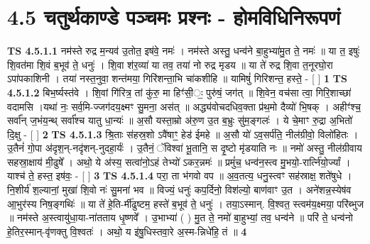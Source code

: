 \documentclass[17pt]{extarticle}
\begin{document}
     \section*{ 4.5      चतुर्थकाण्डे पञ्चमः प्रश्नः - होमविधिनिरूपणं }
                                        \textbf{ TS 4.5.1.1} \newline
                  नम॑स्ते रुद्र म॒न्यव॑ उ॒तोत॒ इष॑वे॒ नमः॑ । नम॑स्ते अस्तु॒ धन्व॑ने बा॒हुभ्या॑मु॒त ते॒ नमः॑ ॥                                   या त॒ इषुः॑ शि॒वत॑मा शि॒वं ब॒भूव॑ ते॒ धनुः॑ । शि॒वा श॑र॒व्या॑ या तव॒ तया॑ नो रुद्र मृडय ॥     या ते॑ रुद्र शि॒वा त॒नूरघो॒रा ऽपा॑पकाशिनी । तया॑ नस्त॒नुवा॒ शन्त॑मया॒ गिरि॑शन्ता॒भि चा॑कशीहि ॥                                यामिषुं॑ गिरिशन्त॒ हस्ते॒ - [  ] \textbf{  1} \newline
                  \newline
                                \textbf{ TS 4.5.1.2} \newline
                  बिभ॒र्ष्यस्त॑वे । शि॒वां गि॑रित्र॒ तां कु॑रु॒ मा हिꣳ॑सी॒ः॒ पुरु॑षं॒ जग॑त् ॥        शि॒वेन॒ वच॑सा त्वा॒ गिरि॒शाच्छा॑ वदामसि ।यथा॑ नः॒ सर्व॒मि-ज्जग॑दय॒क्ष्मꣳ सु॒मना॒ अस॑त् ॥                             अद्ध्य॑वोचदधिव॒क्ता प्र॑थ॒मो दैव्यो॑ भि॒षक् । अहीꣳ॑श्च॒॒ सर्वा᳚न् ज॒भंय॒न्थ् सर्वा᳚श्च यातु धा॒न्यः॑ ॥                          अ॒सौ यस्ता॒म्रो अ॑रु॒ण उ॒त ब॒भ्रुः सु॑म॒ङ्गलः॑ । ये चे॒माꣳ रु॒द्रा अ॒भितो॑ दि॒क्षु - [  ] \textbf{  2} \newline
                  \newline
                                \textbf{ TS 4.5.1.3} \newline
                  श्रि॒ताः स॑हस्र॒शो ऽवै॑षाꣳ॒॒ हेड॑ ईमहे ॥ अ॒सौ यो॑ ऽव॒सर्प॑ति॒ नील॑ग्रीवो॒ विलो॑हितः । उ॒तैनं॑ गो॒पा अ॑दृश॒न्-नदृ॑शन्-नुदहा॒र्यः॑ । उ॒तैनं॒ ॅविश्वा॑ भू॒तानि॒ स दृ॒ष्टो मृ॑डयाति नः ॥                               नमो॑ अस्तु॒ नील॑ग्रीवाय सहस्रा॒क्षाय॑ मी॒ढुषे᳚ । अथो॒ ये अ॑स्य॒ सत्वा॑नो॒ऽहं तेभ्यो॑ ऽकर॒न्नमः॑ ॥                                   प्रमुं॑च॒ धन्व॑न॒स्त्व मु॒भयो॒-रार्त्नि॑यो॒र्ज्यां । याश्च॑ ते॒ हस्त॒ इष॑वः॒ - [  ] \textbf{  3} \newline
                  \newline
                                \textbf{ TS 4.5.1.4} \newline
                  परा॒ ता भ॑गवो वप ॥                                        अ॒व॒तत्य॒ धनु॒स्त्वꣳ सह॑स्राक्ष॒ शते॑षुधे । नि॒शीर्य॑ श॒ल्यानां॒ मुखा॑ शि॒वो नः॑ सु॒मना॑ भव ॥                          विज्यं॒ धनुः॑ कप॒र्दिनो॒ विश॑ल्यो॒ बाण॑वाꣳ उ॒त । अने॑शन्न॒स्येष॑व आ॒भुर॑स्य निष॒ङ्गथिः॑ ॥                                               या ते॑ हे॒ति-र्मी॑ढुष्टम॒ हस्ते॑ ब॒भूव॑ ते॒ धनुः॑ । तया॒ऽस्मान्. वि॒श्वत॒ स्त्वम॑य॒क्ष्मया॒ परि॑ब्भुज ॥                                  नम॑स्ते अ॒स्त्वायु॑धा॒या-ना॑तताय धृ॒ष्णवे᳚ । उ॒भाभ्या॑ ( ) मु॒त ते॒ नमो॑ बा॒हुभ्यां॒ तव॒ धन्व॑ने ॥                      परि॑ ते॒ धन्व॑नो हे॒तिर॒स्मान्-वृ॑णक्तु वि॒श्वतः॑ । अथो॒ य इ॑षु॒धिस्तवा॒रे अ॒स्म-न्निधे॑हि॒ तं ॥ \textbf{  4} \newline
\end{document}
